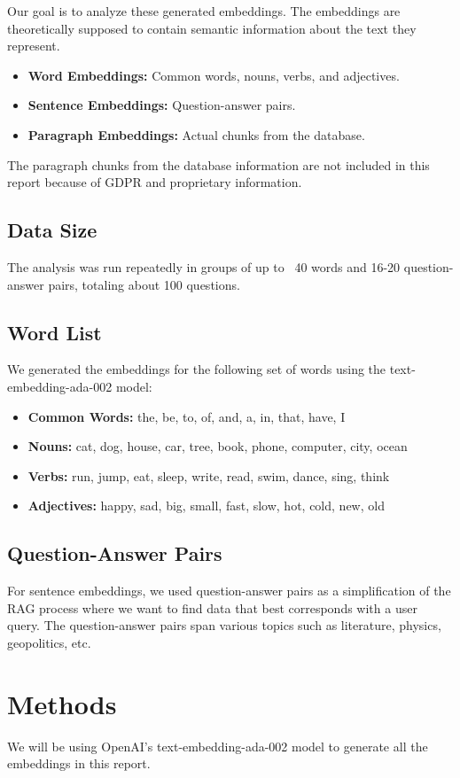 \documentclass{scrartcl}
\begin{document}
Our goal is to analyze these generated embeddings. The embeddings are theoretically supposed to contain semantic information about the text they represent.

\begin{itemize}
    \item \textbf{Word Embeddings:} Common words, nouns, verbs, and adjectives.
    \item \textbf{Sentence Embeddings:} Question-answer pairs.
    \item \textbf{Paragraph Embeddings:} Actual chunks from the database.
\end{itemize}
The paragraph chunks from the database information are not included in this report because of GDPR and proprietary information. 

\subsection{Data Size}
The analysis was run repeatedly in groups of up to ~40 words and 16-20 question-answer pairs, totaling about 100 questions.

\subsection{Word List}
We generated the embeddings for the following set of words using the text-embedding-ada-002 model:
\begin{itemize}
    \item \textbf{Common Words:} the, be, to, of, and, a, in, that, have, I
    \item \textbf{Nouns:} cat, dog, house, car, tree, book, phone, computer, city, ocean
    \item \textbf{Verbs:} run, jump, eat, sleep, write, read, swim, dance, sing, think
    \item \textbf{Adjectives:} happy, sad, big, small, fast, slow, hot, cold, new, old
\end{itemize}

\subsection{Question-Answer Pairs}
For sentence embeddings, we used question-answer pairs as a simplification of the RAG process where we want to find data that best corresponds with a user query. The question-answer pairs span various topics such as literature, physics, geopolitics, etc.

\section{Methods}
We will be using OpenAI's text-embedding-ada-002 model to generate all the embeddings in this report. 
\end{document}
